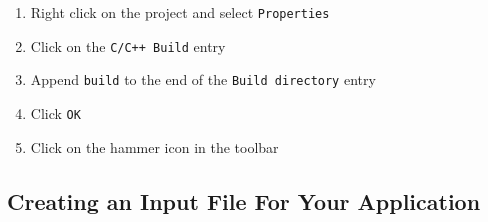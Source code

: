 \begin{enumerate}
  \item Right click on the project and select \texttt{Properties}
  \item Click on the \texttt{C/C++ Build} entry
  \item Append \texttt{build} to the end of the \texttt{Build directory} entry
  \item Click \texttt{OK}
  \item Click on the hammer icon in the toolbar
\end{enumerate}

\subsection{Creating an Input File For Your Application}

